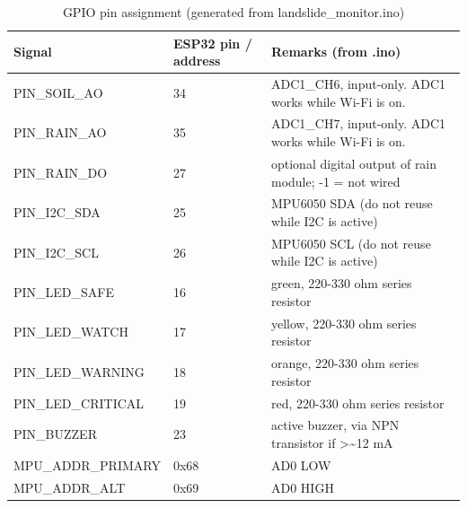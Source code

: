 \begin{table}[htbp]
\centering
\caption{GPIO pin assignment (generated from landslide\_monitor.ino)}
\label{tab:gpio}
\begin{tabular}{lll}
\hline
Signal & ESP32 pin / address & Remarks (from .ino) \\
\hline
PIN\_SOIL\_AO & 34 & ADC1\_CH6, input-only. ADC1 works while Wi-Fi is on. \\
PIN\_RAIN\_AO & 35 & ADC1\_CH7, input-only. ADC1 works while Wi-Fi is on. \\
PIN\_RAIN\_DO & 27 & optional digital output of rain module; -1 = not wired \\
PIN\_I2C\_SDA & 25 & MPU6050 SDA (do not reuse while I2C is active) \\
PIN\_I2C\_SCL & 26 & MPU6050 SCL (do not reuse while I2C is active) \\
PIN\_LED\_SAFE & 16 & green, 220-330 ohm series resistor \\
PIN\_LED\_WATCH & 17 & yellow, 220-330 ohm series resistor \\
PIN\_LED\_WARNING & 18 & orange, 220-330 ohm series resistor \\
PIN\_LED\_CRITICAL & 19 & red, 220-330 ohm series resistor \\
PIN\_BUZZER & 23 & active buzzer, via NPN transistor if >\textasciitilde{}12 mA \\
MPU\_ADDR\_PRIMARY & 0x68 & AD0 LOW \\
MPU\_ADDR\_ALT & 0x69 & AD0 HIGH \\
\hline
\end{tabular}
\end{table}
